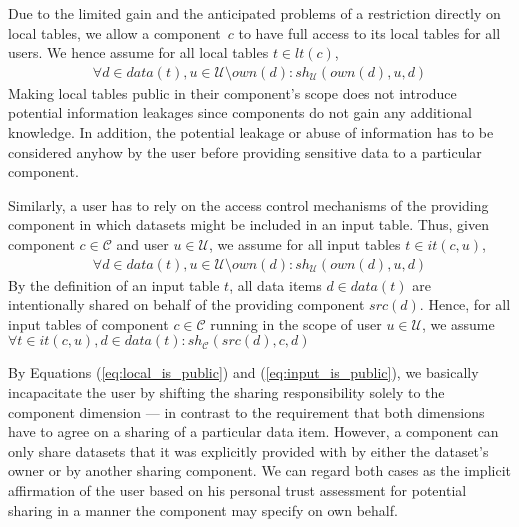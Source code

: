 \documentclass{src/acm_proc_article-sp} \else
\newcommand\cC{\ensuremath{\mathcal{C}}\xspace}
\newcommand\cU{\ensuremath{\mathcal{U}}\xspace}
\begin{document}
Due to the limited gain and the anticipated problems of a restriction
directly on local tables, we allow a component~$c$ to have full
access to its local tables for all users. We hence assume for all
local tables $t\!\in\!\mathit{lt(c)}$,
\begin{equation}\label{eq:local_is_public}
    \begin{aligned}
      \forall d\!\in\!\mathit{data(t)}, u\!\in\!\cU \setminus\!\mathit{own(d)}\colon \mathit{sh_{\cU}(own(d), u, d)} \end{aligned}
\end{equation}
Making local tables public in their component's scope does not
introduce potential information leakages since components do not gain any additional knowledge. In addition,
the potential leakage or abuse of information has to be considered
anyhow by the user before providing sensitive data to a particular
component.



  Similarly, a user has to rely on the access control mechanisms of
  the providing component in which datasets might be included in an
  input table.
  Thus, given component $c \in \cC$ and user $u \in \cU$, we assume
  for all input tables $t\!\in\!\mathit{it(c, u)}$,
  \begin{equation}\label{eq:input_is_public}
    \begin{aligned}
      \forall d\!\in\!\mathit{data(t)}, u\!\in\!\cU\setminus\!\mathit{own(d)}\colon
                                                                   \mathit{sh_{\cU}(own(d), u, d)} \end{aligned}
\end{equation}
By the definition of an input table $t$, all data items $d \in
\mathit{data(t)}$ are intentionally shared on behalf of the providing
component $\mathit{src(d)}$. Hence, for all input tables of component
$c \in \cC$ running in the scope of user $u \in \cU$, we assume
$
    \forall t \in \mathit{it(c, u)}, d \in \mathit{data(t)} \colon \mathit{sh_{\cC}(src(d), c, d)}
$


By Equations (\ref{eq:local_is_public}) and (\ref{eq:input_is_public}), we basically incapacitate the user by shifting the sharing responsibility solely to the component dimension --- in contrast to the requirement that both dimensions have to agree on a sharing of a particular data item.
However, a component can only share datasets that it was explicitly provided with by either the dataset's owner or by another sharing component. We can regard both cases as the implicit affirmation of the user based on his personal trust assessment for potential sharing in a manner the component may specify on own behalf.
\end{document}
